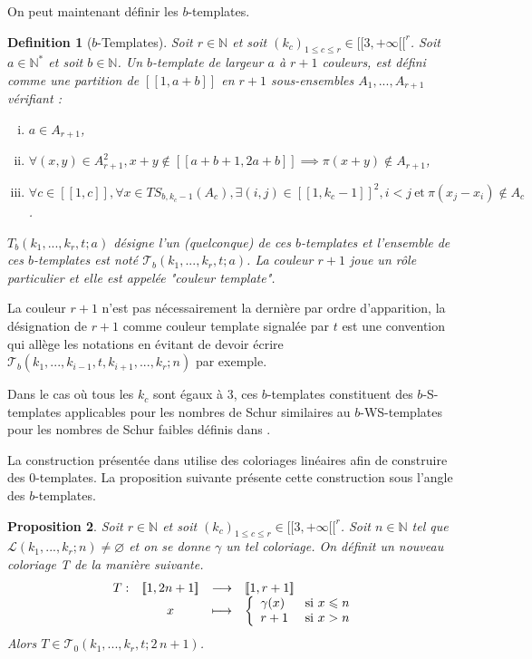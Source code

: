 \documentclass{article}
\newtheorem{definition}{Definition}[section]
\newtheorem{proposition}[definition]{Proposition}
\newcommand{\TS}{\mathit{TS}}
\begin{document}
On peut maintenant définir les \(b\)-templates.

\begin{definition}[\(b\)-Templates]
Soit \(r \in \mathbb{N}\) et soit \((k_c)_{1 \leqslant c \leqslant r} \in {[\![3, +\infty[\![}^r\). Soit \(a \in \mathbb{N}^*\) et soit \(b \in \mathbb{N}\).  Un \(b\)-template de largeur \(a\) à \(r + 1\) couleurs, est défini comme une partition de \([\![1, a + b]\!]\) en \(r+1\) sous-ensembles \(A_1, ..., A_{r+1}\) vérifiant :
\begin{enumerate}[(i)]
\item \(a \in A_{r+1}\),
\item \(\forall (x, y) \in A_{r + 1}^2, x + y \notin [\![a + b + 1, 2 a + b]\!] \implies \pi(x + y) \notin A_{r + 1}\),
\item \(\forall c \in [\![1, c]\!], \forall x \in \TS_{b, k_c - 1}(A_c), \exists (i, j) \in {[\![1, k_c - 1]\!]}^2, i < j ~\text{et}~ \pi(x_j - x_i) \notin A_c\).
\end{enumerate}
 \(T_b(k_1, ..., k_r, t; a)\) désigne l'un (quelconque) de ces \(b\)-templates et l'ensemble de ces \(b\)-templates est noté \(\mathcal{T}_b(k_1, ..., k_r, t; a)\).  La couleur \(r + 1\) joue un rôle particulier et elle est appelée "couleur template".
\end{definition}

La couleur \(r + 1\)  n'est pas nécessairement la dernière par ordre d'apparition, la désignation de \(r+1\) comme couleur template signalée par \(t\) est une convention qui allège les notations en évitant de devoir écrire \(\mathcal{T}_b(k_1, ..., k_{i - 1}, t,  k_{i + 1}, ..., k_r; n)\) par exemple.

Dans le cas où tous les \(k_c\) sont égaux à 3, ces \(b\)-templates constituent des \(b\)-S-templates applicables pour les nombres de Schur similaires au \(b\)-WS-templates pour les nombres de Schur faibles définis dans \cite{schurboyz}.

La construction présentée dans \cite{rowleyramseyabott} utilise des coloriages linéaires afin de construire des \(0\)-templates. La proposition suivante présente cette construction sous l'angle des \(b\)-templates.
\begin{proposition}
Soit \(r \in \mathbb{N}\) et soit \((k_c)_{1 \leqslant c \leqslant r} \in {[\![3, +\infty[\![}^r\). Soit \(n \in \mathbb{N}\) tel que \(\mathcal{L}(k_1, ..., k_r; n) \neq \varnothing\) et on se donne \(\gamma\) un tel coloriage. On définit un nouveau coloriage T de la manière suivante.
\[\begin{array}{c c c l}
	T : & [\![1, 2 n + 1]\!] & \longrightarrow & [\![1, r + 1]\!] \\
	 & x & \longmapsto & \left\{
		\begin{array}{l l}
			\gamma(x) & ~\text{si}~ x \leqslant n \\
			r + 1 & ~\text{si}~ x > n \\
		\end{array}
		\right.
\end{array}\]
Alors \(T \in \mathcal{T}_0(k_1, ..., k_r, t; 2 \, n + 1)\).
\end{proposition}
\end{document}
